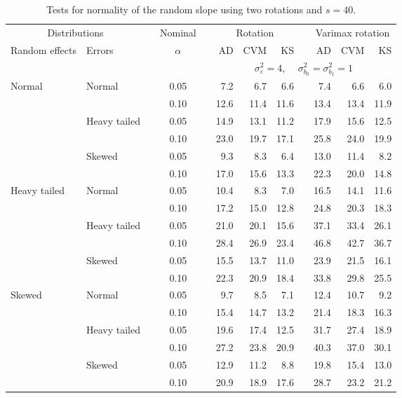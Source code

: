 \begin{table}[ht]
\caption{\label{tab:simb1s40-alt}Tests for normality of the random slope using two rotations and $s = 40$.}
\begin{scriptsize}
\begin{center}
\begin{tabular}{ll p{.1cm} c p{.1cm} rrr p{.1cm} rrr}
  \hline
  \multicolumn{2}{c}{Distributions}& & Nominal & &  \multicolumn{3}{c}{Rotation} & & \multicolumn{3}{c}{Varimax rotation} \\ \cline{1-2} \cline{6-8} \cline{10-12}   
  Random effects & Errors & & $\alpha$ & & AD & CVM & KS & & AD & CVM & KS \\ 
   \hline
& && && \multicolumn{7}{c}{$\sigma_{\varepsilon}^2 = 4$, \ \ $\sigma_{b_0}^2 = \sigma_{b_1}^2 = 1$} \\ \cline{6-12}
Normal       & Normal       && 0.05 &&   7.2 & 6.7 & 6.6 &   & 7.4 & 6.6 & 6.0 \\ 
             &              && 0.10 &&   12.6 & 11.4 & 11.6 &   & 13.4 & 13.4 & 11.9 \\ 
             & Heavy tailed && 0.05 &&   14.9 & 13.1 & 11.2 &   & 17.9 & 15.6 & 12.5 \\ 
             &              && 0.10 &&   23.0 & 19.7 & 17.1 &   & 25.8 & 24.0 & 19.9 \\ 
             & Skewed       && 0.05 &&   9.3 & 8.3 & 6.4 &   & 13.0 & 11.4 & 8.2 \\ 
             &              && 0.10 &&   17.0 & 15.6 & 13.3 &   & 22.3 & 20.0 & 14.8 \\ 
Heavy tailed & Normal       && 0.05 &&   10.4 & 8.3 & 7.0 &   & 16.5 & 14.1 & 11.6 \\ 
             &              && 0.10 &&   17.2 & 15.0 & 12.8 &   & 24.8 & 20.3 & 18.3 \\ 
             & Heavy tailed && 0.05 &&   21.0 & 20.1 & 15.6 &   & 37.1 & 33.4 & 26.1 \\ 
             &              && 0.10 &&   28.4 & 26.9 & 23.4 &   & 46.8 & 42.7 & 36.7 \\ 
             & Skewed       && 0.05 &&   15.5 & 13.7 & 11.0 &   & 23.9 & 21.5 & 16.1 \\ 
             &              && 0.10 &&   22.3 & 20.9 & 18.4 &   & 33.8 & 29.8 & 25.5 \\ 
Skewed       & Normal       && 0.05 &&   9.7 & 8.5 & 7.1 &   & 12.4 & 10.7 & 9.2 \\ 
             &              && 0.10 &&   15.4 & 14.7 & 13.2 &   & 21.4 & 18.3 & 16.3 \\ 
             & Heavy tailed && 0.05 &&   19.6 & 17.4 & 12.5 &   & 31.7 & 27.4 & 18.9 \\ 
             &              && 0.10 &&   27.2 & 23.8 & 20.9 &   & 40.3 & 37.0 & 30.1 \\ 
             & Skewed       && 0.05 &&   12.9 & 11.2 & 8.8 &   & 19.8 & 15.4 & 13.0 \\ 
             &              && 0.10 &&   20.9 & 18.9 & 17.6 &   & 28.7 & 23.2 & 21.2 \\ 


\end{tabular}
\end{center}
\end{scriptsize}
\end{table}
